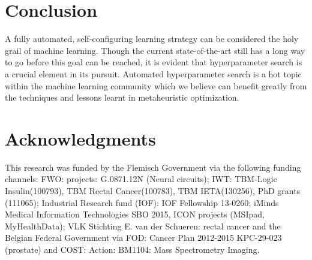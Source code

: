 \section{Conclusion}
A fully automated, self-configuring learning strategy can be considered the holy grail of machine learning. Though the current state-of-the-art still has a long way to go before this goal can be reached, it is evident that hyperparameter search is a crucial element in its pursuit. Automated hyperparameter search is a hot topic within the machine learning community which we believe can benefit greatly from the techniques and lessons learnt in metaheuristic optimization.


\section*{Acknowledgments}
This research was funded by the Flemisch Government via the following funding channels: FWO: projects:  G.0871.12N (Neural circuits); IWT: TBM-Logic Insulin(100793), TBM Rectal Cancer(100783), TBM IETA(130256), PhD grants (111065); Industrial Research fund (IOF): IOF Fellowship 13-0260; iMinds Medical Information Technologies SBO 2015, ICON projects (MSIpad, MyHealthData); VLK Stichting E. van der Schueren: rectal cancer and the Belgian Federal Government via FOD: Cancer Plan 2012-2015 KPC-29-023 (prostate) and COST: Action: BM1104: Mass Spectrometry Imaging.


\newpage




